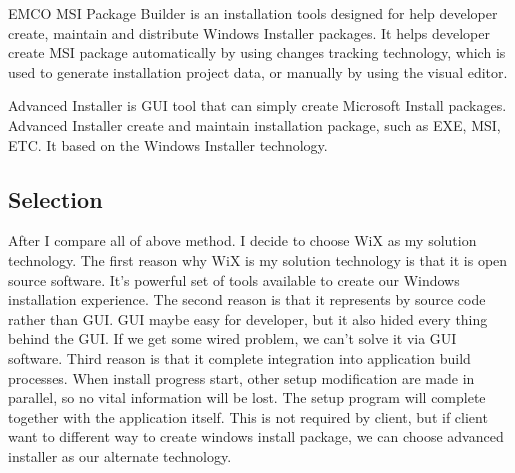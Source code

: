 EMCO MSI Package Builder is an installation tools designed for help developer create, maintain and distribute Windows Installer packages. \cite{EMCO_MSI} It helps developer create MSI package automatically by using changes tracking technology, which is used to generate installation project data, or manually by using the visual editor.

Advanced Installer is GUI tool that can simply create Microsoft Install packages. Advanced Installer create and maintain installation package, such as EXE, MSI, ETC. It based on the Windows Installer technology. \cite{advanced_install}


\subsection{Selection}
After I compare all of above method. I decide to choose WiX as my solution technology. The first reason why WiX is my solution technology is that it is open source software. It's powerful set of tools available to create our Windows installation experience.
The second reason is that it represents by source code rather than GUI. GUI maybe easy for developer, but it also hided every thing behind the GUI. If we get some wired problem, we can't solve it via GUI software. 
Third reason is that it complete integration into application build processes. When install progress start, other setup modification are made in parallel, so no vital information will be lost. The setup program will complete together with the application itself. This is not required by client, but if client want to different way to create windows install package, we can choose advanced installer as our alternate technology.
